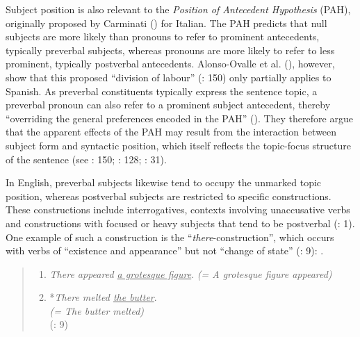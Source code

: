 \documentclass[
  letterpaper,
  DIV=11,
  numbers=noendperiod]{scrartcl}
\providecommand{\tightlist}{%
  \setlength{\itemsep}{0pt}\setlength{\parskip}{0pt}}
\begin{document}
Subject position is also relevant to the \emph{Position of Antecedent
Hypothesis} (PAH), originally proposed by Carminati
() for Italian. The PAH predicts that
null subjects are more likely than pronouns to refer to prominent
antecedents, typically preverbal subjects, whereas pronouns are more
likely to refer to less prominent, typically postverbal antecedents.
Alonso-Ovalle et al. (), however,
show that this proposed ``division of labour''
(: 150) only partially applies to
Spanish. As preverbal constituents typically express the sentence topic,
a preverbal pronoun can also refer to a prominent subject antecedent,
thereby ``overriding the general preferences encoded in the PAH''
(). They
therefore argue that the apparent effects of the PAH may result from the
interaction between subject form and syntactic position, which itself
reflects the topic-focus structure of the sentence (see
: 150;
: 128;
: 31).

In English, preverbal subjects likewise tend to occupy the unmarked
topic position, whereas postverbal subjects are restricted to specific
constructions. These constructions include interrogatives, contexts
involving unaccusative verbs and constructions with focused or heavy
subjects that tend to be postverbal (: 1). One example of such a construction is the
``\emph{there}-construction'', which occurs with verbs of ``existence
and appearance'' but not ``change of state''
(: 9): .

\begin{quote}
\begin{enumerate}
\def\labelenumi{\arabic{enumi}.}
\setcounter{enumi}{23}
\tightlist
\item
  \emph{There appeared \ul{a grotesque figure}}.\emph{\hfill\break
  (= A grotesque figure appeared)}
\item
  *\emph{There melted \ul{the butter}}.\\
  \emph{(= The butter melted)}\\
  (: 9)
\end{enumerate}
\end{quote}
\end{document}
